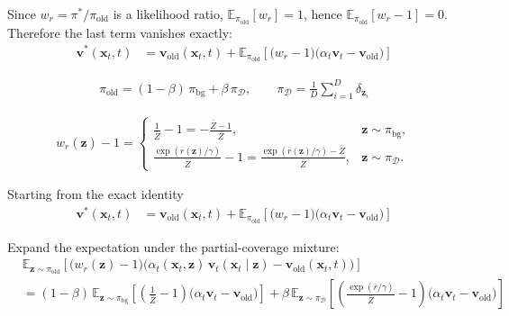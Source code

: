 \documentclass{article} %
\begin{document}
Since $w_r = \pi^* / \pi_{\mathrm{old}}$ is a likelihood ratio, $\mathbb{E}_{\pi_{\mathrm{old}}}[w_r]=1$, hence $\mathbb{E}_{\pi_{\mathrm{old}}}[w_r-1]=0$. Therefore the last term vanishes exactly:
\begin{align}
    \mathbf{v}^*(\mathbf{x}_t, t)
    &=
    \mathbf{v}_{\mathrm{old}}(\mathbf{x}_t, t)
    +
    \mathbb{E}_{\pi_{\mathrm{old}}}
    \left[
        \bigl( w_r - 1 \bigr)
        \bigl( \alpha_t \mathbf{v}_t - \mathbf{v}_{\mathrm{old}} \bigr)
    \right]
\end{align}

\begin{align}
    \pi_{\mathrm{old}}
    =
    (1-\beta)\,\pi_{\mathrm{bg}}
    +
    \beta\,\pi_{\mathcal{D}},
    \qquad
    \pi_{\mathcal{D}}
    =
    \frac{1}{D}
    \sum_{i=1}^{D}
    \delta_{\mathbf{z}_i}
\end{align}

\begin{align}
    w_r(\mathbf{z}) - 1
    =
    \begin{cases}
        \displaystyle
        \frac{1}{\bar{Z}} - 1
        =
        -\frac{\bar{Z}-1}{\bar{Z}},
        & \mathbf{z} \sim \pi_{\mathrm{bg}},
        \\[4mm]
        \displaystyle
        \frac{\exp\!\left( \bar{r}(\mathbf{z})/\gamma \right)}{\bar{Z}} - 1
        =
        \frac{\exp\!\left( \bar{r}(\mathbf{z})/\gamma \right) - \bar{Z}}{\bar{Z}},
        & \mathbf{z} \sim \pi_{\mathcal{D}}.
    \end{cases}
\end{align}

Starting from the exact identity
\begin{align}
    \mathbf{v}^*(\mathbf{x}_t, t)
    &=
    \mathbf{v}_{\mathrm{old}}(\mathbf{x}_t, t)
    +
    \mathbb{E}_{\pi_{\mathrm{old}}}
    \left[
        \bigl( w_r - 1 \bigr)
        \bigl(
            \alpha_t \mathbf{v}_t - \mathbf{v}_{\mathrm{old}}
        \bigr)
    \right]
\end{align}

Expand the expectation under the partial-coverage mixture:
\begin{align}
    &\mathbb{E}_{\mathbf{z} \sim \pi_{\mathrm{old}}}
    \left[
        \bigl( w_r(\mathbf{z}) - 1 \bigr)
        \bigl(
            \alpha_t(\mathbf{x}_t, \mathbf{z})\,
            \mathbf{v}_t(\mathbf{x}_t \mid \mathbf{z})
            -
            \mathbf{v}_{\mathrm{old}}(\mathbf{x}_t, t)
        \bigr)
    \right]
    \\
    &=
    (1-\beta)\,
    \mathbb{E}_{\mathbf{z} \sim \pi_{\mathrm{bg}}}
    \left[
        \left( \frac{1}{\bar{Z}} - 1 \right)
        \bigl(
            \alpha_t \mathbf{v}_t - \mathbf{v}_{\mathrm{old}}
        \bigr)
    \right]
    +
    \beta\,
    \mathbb{E}_{\mathbf{z} \sim \pi_{\mathcal{D}}}
    \left[
        \left(
            \frac{\exp(\bar{r}/\gamma)}{\bar{Z}} - 1
        \right)
        \bigl(
            \alpha_t \mathbf{v}_t - \mathbf{v}_{\mathrm{old}}
        \bigr)
    \right]
\end{align}
\end{document}
